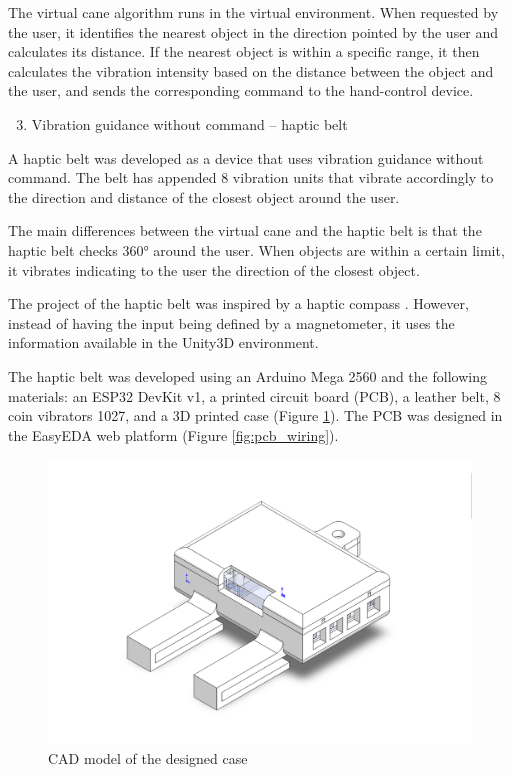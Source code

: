         The virtual cane algorithm runs in the virtual environment. When requested by the user, it identifies the nearest object in the direction pointed by the user and calculates its distance. If the nearest object is within a specific range, it then calculates the vibration intensity based on the distance between the object and the user, and sends the corresponding command to the hand-control device.

        \begin{enumerate} [label = \Alph*)]
            \setcounter{enumi}{2}
            \item Vibration guidance without command – haptic belt
        \end{enumerate}

        A haptic belt was developed as a device that uses vibration guidance without command. The belt has appended 8 vibration units that vibrate accordingly to the direction and distance of the closest object around the user. 

        The main differences between the virtual cane and the haptic belt is that the haptic belt checks 360° around the user. When objects are within a certain limit, it vibrates indicating to the user the direction of the closest object. 

        The project of the haptic belt was inspired by a haptic compass \cite{kylecorry31_instructables_2020}. However, instead of having the input being defined by a magnetometer, it uses the information available in the Unity3D environment.

        The haptic belt was developed using an Arduino Mega 2560 and the following materials: an ESP32 DevKit v1, a printed circuit board (PCB), a leather belt, 8 coin vibrators 1027, and a 3D printed case (Figure \ref{fig:case_cinto}). The PCB was designed in the EasyEDA web platform (Figure \ref{fig:pcb_wiring}). 

        \begin{figure}[!htb]
            \centering
            \includegraphics[width = 0.8\linewidth]{Metodologia/Case Cinto.png}
            \caption{CAD model of the designed case}
            \label{fig:case_cinto}
        \end{figure}

